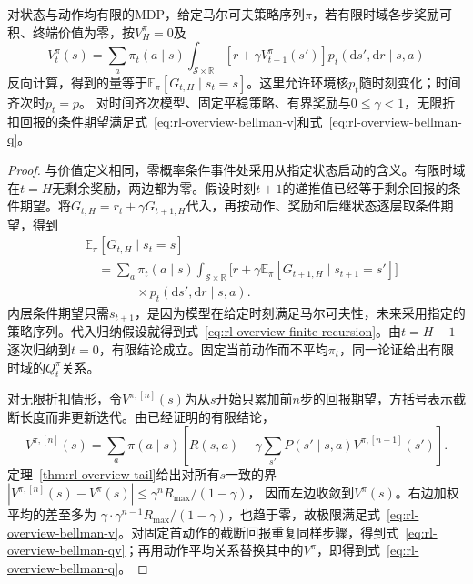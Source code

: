 \begin{theorem}[回报期望与递推一致]
  \label{thm:rl-overview-recursion}
  对状态与动作均有限的MDP，给定马尔可夫策略序列$\pi$，若有限时域各步奖励可积、终端价值为零，按$V_H^\pi=0$及
  \begin{equation}
    V_t^\pi(s)=\sum_a\pi_t(a\mid s)
      \int_{\mathcal S\times\mathbb R}
      [r+\gamma V_{t+1}^\pi(s')]
      p_t(\mathrm d s',\mathrm d r\mid s,a)
    \label{eq:rl-overview-finite-recursion}
  \end{equation}
  反向计算，得到的量等于$\mathbb E_\pi[G_{t,H}\mid s_t=s]$。这里允许环境核$p_t$随时刻变化；时间齐次时$p_t=p$。
  对时间齐次模型、固定平稳策略、有界奖励与$0\leq\gamma<1$，无限折扣回报的条件期望满足式~\eqref{eq:rl-overview-bellman-v}和式~\eqref{eq:rl-overview-bellman-q}。
\end{theorem}

\begin{proof}
  与价值定义相同，零概率条件事件处采用从指定状态启动的含义。有限时域在$t=H$无剩余奖励，两边都为零。假设时刻$t+1$的递推值已经等于剩余回报的条件期望。将$G_{t,H}=r_t+\gamma G_{t+1,H}$代入，再按动作、奖励和后继状态逐层取条件期望，得到
  \[
  \begin{aligned}
   &\mathbb E_\pi[G_{t,H}\mid s_t=s]\\
   &\quad=\sum_a\pi_t(a\mid s)
      \int_{\mathcal S\times\mathbb R}
      \bigl[r+\gamma\mathbb E_\pi[G_{t+1,H}\mid s_{t+1}=s']\bigr]\\
   &\qquad\qquad{}\times p_t(\mathrm d s',\mathrm d r\mid s,a).
  \end{aligned}
  \]
  内层条件期望只需$s_{t+1}$，是因为模型在给定时刻满足马尔可夫性，未来采用指定的策略序列。代入归纳假设就得到式~\eqref{eq:rl-overview-finite-recursion}。由$t=H-1$逐次归纳到$t=0$，有限结论成立。固定当前动作而不平均$\pi_t$，同一论证给出有限时域的$Q_t^\pi$关系。

  对无限折扣情形，令$V^{\pi,[n]}(s)$为从$s$开始只累加前$n$步的回报期望，方括号表示截断长度而非更新迭代。由已经证明的有限结论，
  \[
    V^{\pi,[n]}(s)=\sum_a\pi(a\mid s)
       \left[R(s,a)+\gamma\sum_{s'}P(s'\mid s,a)
                                       V^{\pi,[n-1]}(s')\right].
  \]
  定理~\ref{thm:rl-overview-tail}给出对所有$s$一致的界
  $|V^{\pi,[n]}(s)-V^\pi(s)|\leq\gamma^nR_{\max}/(1-\gamma)$，
  因而左边收敛到$V^\pi(s)$。右边加权平均的差至多为
  $\gamma\cdot\gamma^{n-1}R_{\max}/(1-\gamma)$，也趋于零，故极限满足式~\eqref{eq:rl-overview-bellman-v}。对固定首动作的截断回报重复同样步骤，得到式~\eqref{eq:rl-overview-bellman-qv}；再用动作平均关系替换其中的$V^\pi$，即得到式~\eqref{eq:rl-overview-bellman-q}。
\end{proof}

